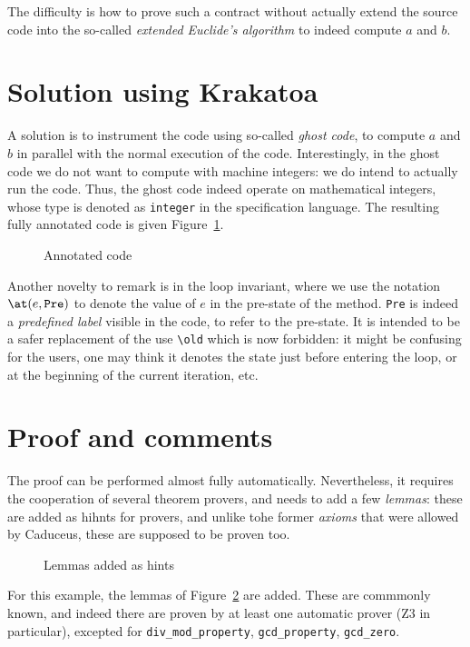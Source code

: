 \documentclass[a4paper,12pt]{article}
\begin{document}
The difficulty is how to prove such a contract without actually
extend the source code into the so-called \emph{extended Euclide's
algorithm} to indeed compute $a$ and $b$. 

\section{Solution using Krakatoa}

A solution is to instrument the code using so-called \emph{ghost
  code}, to compute $a$ and $b$ in parallel with the normal execution
of the code. Interestingly, in the ghost code we do not want to
compute with machine integers: we do intend to actually run the
code. Thus, the ghost code indeed operate on mathematical integers,
whose type is denoted as \texttt{integer} in the specification
language. The resulting fully annotated code is given Figure~\ref{fig:code}.

\begin{figure}[t]
  
  \caption{Annotated code}
\label{fig:code}
\hrulefill
\end{figure}

Another novelty to remark is in the loop invariant, where we use the
notation $\verb|\at|(e,\texttt{Pre})$ to denote the value of $e$ in
the pre-state of the method. \texttt{Pre} is indeed a \emph{predefined
  label} visible in the code, to refer to the pre-state. It is
intended to be a safer replacement of the use \verb|\old| which is now
forbidden: it might be confusing for the users, one may think it
denotes the state just before entering the loop, or at the beginning
of the current iteration, etc.

\section{Proof and comments}

The proof can be performed almost fully automatically. Nevertheless,
it requires the cooperation of several theorem provers, and needs to
add a few \emph{lemmas}: these are added as hihnts for provers, and
unlike tohe former \emph{axioms} that were allowed by Caduceus, these
are supposed to be proven too.

\begin{figure}[p]
  
  \caption{Lemmas added as hints}
\label{fig:lemmas}
\end{figure}

For this example, the lemmas of Figure~\ref{fig:lemmas} are
added. These are commmonly known, and indeed there are proven by at
least one automatic prover (Z3 in particular), excepted for
\verb|div_mod_property|, \verb|gcd_property|, \verb|gcd_zero|.
\end{document}
